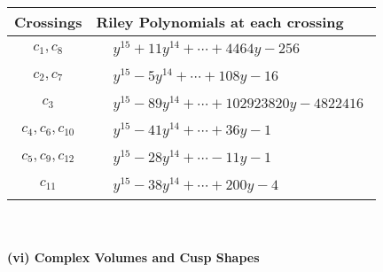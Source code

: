 \documentclass[1p]{elsarticle_modified}
\theoremstyle{definition}
\begin{document}
\begin{tabular}{m{50pt}|m{274pt}}
Crossings & \hspace{64pt}Riley Polynomials at each crossing \\
\hline $$\begin{aligned}c_{1},c_{8}\end{aligned}$$&$\begin{aligned}
&y^{15}+11 y^{14}+\cdots+4464 y-256
\end{aligned}$\\
\hline $$\begin{aligned}c_{2},c_{7}\end{aligned}$$&$\begin{aligned}
&y^{15}-5 y^{14}+\cdots+108 y-16
\end{aligned}$\\
\hline $$\begin{aligned}c_{3}\end{aligned}$$&$\begin{aligned}
&y^{15}-89 y^{14}+\cdots+102923820 y-4822416
\end{aligned}$\\
\hline $$\begin{aligned}c_{4},c_{6},c_{10}\end{aligned}$$&$\begin{aligned}
&y^{15}-41 y^{14}+\cdots+36 y-1
\end{aligned}$\\
\hline $$\begin{aligned}c_{5},c_{9},c_{12}\end{aligned}$$&$\begin{aligned}
&y^{15}-28 y^{14}+\cdots-11 y-1
\end{aligned}$\\
\hline $$\begin{aligned}c_{11}\end{aligned}$$&$\begin{aligned}
&y^{15}-38 y^{14}+\cdots+200 y-4
\end{aligned}$\\
\hline
\end{tabular}\\~\\
\newpage\flushleft \textbf{(vi) Complex Volumes and Cusp Shapes}
\end{document}
